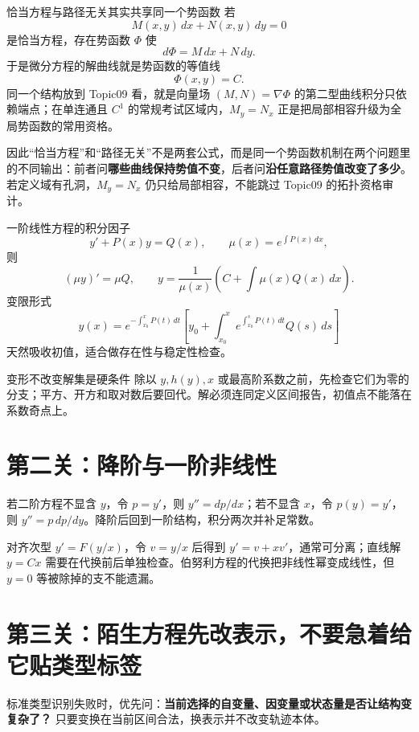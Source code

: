 \documentclass[11pt,a4paper,fontset=fandol]{ctexart}
\begin{document}
\begin{corebox}{恰当方程与路径无关其实共享同一个势函数}
若
\[
M(x,y)\,dx+N(x,y)\,dy=0
\]
是恰当方程，存在势函数 $\Phi$ 使
\[
d\Phi=M\,dx+N\,dy.
\]
于是微分方程的解曲线就是势函数的等值线
\[
\boxed{\Phi(x,y)=C}.
\]
同一个结构放到 Topic09 看，就是向量场 $(M,N)=\nabla\Phi$ 的第二型曲线积分只依赖端点；在单连通且 $C^1$ 的常规考试区域内，$M_y=N_x$ 正是把局部相容升级为全局势函数的常用资格。

因此“恰当方程”和“路径无关”不是两套公式，而是同一个势函数机制在两个问题里的不同输出：前者问\textbf{哪些曲线保持势值不变}，后者问\textbf{沿任意路径势值改变了多少}。若定义域有孔洞，$M_y=N_x$ 仍只给局部相容，不能跳过 Topic09 的拓扑资格审计。
\end{corebox}

\begin{methodbox}{一阶线性方程的积分因子}
\[
y'+P(x)y=Q(x),\qquad \mu(x)=e^{\int P(x)\,dx},
\]
则
\[
(\mu y)'=\mu Q,\qquad
y=\frac{1}{\mu(x)}\left(C+\int \mu(x)Q(x)\,dx\right).
\]
变限形式
\[
y(x)=e^{-\int_{x_0}^{x}P(t)\,dt}\left[y_0+\int_{x_0}^{x}e^{\int_{x_0}^{s}P(t)\,dt}Q(s)\,ds\right]
\]
天然吸收初值，适合做存在性与稳定性检查。
\end{methodbox}

\begin{warnbox}{变形不改变解集是硬条件}
除以 $y,h(y),x$ 或最高阶系数之前，先检查它们为零的分支；平方、开方和取对数后要回代。解必须连同定义区间报告，初值点不能落在系数奇点上。
\end{warnbox}

\section{第二关：降阶与一阶非线性}
若二阶方程不显含 $y$，令 $p=y'$，则 $y''=dp/dx$；若不显含 $x$，令 $p(y)=y'$，则 $y''=p\,dp/dy$。降阶后回到一阶结构，积分两次并补足常数。

对齐次型 $y'=F(y/x)$，令 $v=y/x$ 后得到 $y'=v+xv'$，通常可分离；直线解 $y=Cx$ 需要在代换前后单独检查。伯努利方程的代换把非线性幂变成线性，但 $y=0$ 等被除掉的支不能遗漏。

\section{第三关：陌生方程先改表示，不要急着给它贴类型标签}

标准类型识别失败时，优先问：\textbf{当前选择的自变量、因变量或状态量是否让结构变复杂了？} 只要变换在当前区间合法，换表示并不改变轨迹本体。
\end{document}
